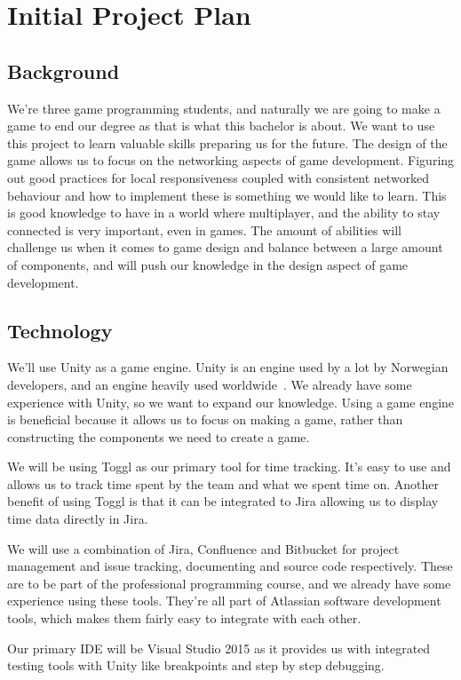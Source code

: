 \chapter{Initial Project Plan}
\label{app:projectPlan}
\section{Background}
We’re three game programming students, and naturally we are going to make a game to end our degree as that is what this bachelor is about. We want to use this project to learn valuable skills preparing us for the future. The design of the game allows us to focus on the networking aspects of game development. Figuring out good practices for local responsiveness coupled with consistent networked behaviour and how to implement these is something we would like to learn. This is good knowledge to have in a world where multiplayer, and the ability to stay connected is very important, even in games.
The amount of abilities will challenge us when it comes to game design and balance between a large amount of components, and will push our knowledge in the design aspect of game development. 

\section{Technology}
We’ll use Unity as a game engine. Unity is an engine used by a lot by Norwegian developers, and an engine heavily used worldwide~\cite{unityUsageStatistics}. We already have some experience with Unity, so we want to expand our knowledge. 
Using a game engine is beneficial because it allows us to focus on making a game, rather than constructing the components we need to create a game. 

We will be using Toggl as our primary tool for time tracking. It’s easy to use and allows us to track time spent by the team and what we spent time on. Another benefit of using Toggl is that it can be integrated to Jira allowing us to display time data directly in Jira. 

We will use a combination of Jira, Confluence and Bitbucket for project management and issue tracking, documenting and source code respectively. These are to be part of the professional programming course, and we already have some experience using these tools. They’re all part of Atlassian software development tools, which makes them fairly easy to integrate with each other.

Our primary IDE will be Visual Studio 2015 as it provides us with integrated testing tools with Unity like breakpoints and step by step debugging.  

